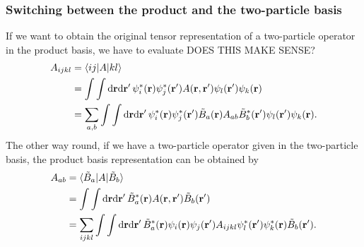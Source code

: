 \documentclass[12pt,a4paper]{scrartcl}
\numberwithin{equation}{section}
\newcommand{\cng}[1]{{\color{red}#1}}
\renewcommand{\vec}{\mathbf}
\begin{document}
\subsubsection{Switching between the product and the two-particle basis}
If we want to obtain the original tensor representation of a two-particle operator in the 
product basis, we have to evaluate \cng{DOES THIS MAKE SENSE?}
\begin{align}
A_{ijkl} &= \braket{ij | A | kl }  \\
&= \int \int \mathrm{d}\vec{r}\mathrm{d}\vec{r}' \, \psi^*_i(\vec{r})\psi^*_j(\vec{r}') 
                                          A(\vec{r},\vec{r}') \psi_l(\vec{r}')\psi_k(\vec{r}) \\
&= \sum_{a,b}\int \int \mathrm{d}\vec{r}\mathrm{d}\vec{r}' \, \psi^*_i(\vec{r})\psi^*_j(\vec{r}') 
         \tilde{B}_a(\vec{r}) A_{ab}\tilde{B}^*_b(\vec{r}') \psi_l(\vec{r}')\psi_k(\vec{r}).
\end{align}
The other way round, if we have a two-particle operator given in the two-particle basis, the product basis
representation can be obtained by
\begin{align}
A_{ab}
&= \braket{ \tilde{B}_a | A | \tilde{B}_b } \\
&= \int \int \mathrm{d}\vec{r}\mathrm{d}\vec{r}' \,  \tilde{B}^*_a(\vec{r})  A(\vec{r},\vec{r}') \tilde{B}_b(\vec{r}') \\
&=\sum_{ijkl} \int \int \mathrm{d}\vec{r}\mathrm{d}\vec{r}' \,  \tilde{B}^*_a(\vec{r})  
    \psi_i(\vec{r})\psi_j(\vec{r}') A_{ijkl} \psi^*_l(\vec{r}')\psi^*_k(\vec{r}) \tilde{B}_b(\vec{r}') .
\end{align}


% 
% 
\end{document}
